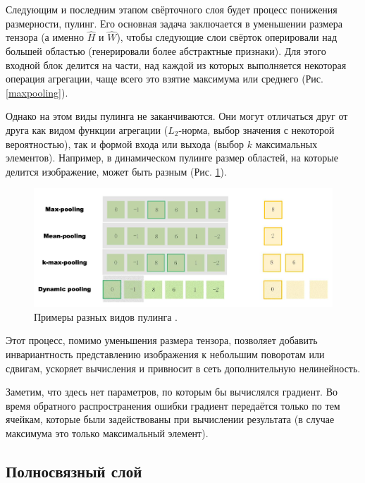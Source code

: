 \documentclass[12pt, fleqn]{article}
\begin{document}
    Следующим и последним этапом свёрточного слоя будет процесс понижения размерности, 
    пулинг. Его основная задача заключается в уменьшении размера тензора (а именно $\hat{H}$ и $\hat{W}$), 
    чтобы следующие слои свёрток оперировали над большей областью (генерировали более абстрактные признаки). 
    Для этого входной блок делится на части, над каждой из которых выполняется некоторая операция агрегации, 
    чаще всего это взятие максимума или среднего (Рис. \ref{maxpooling}).

    Однако на этом виды пулинга не заканчиваются. Они могут отличаться друг от друга как видом
    функции агрегации ($L_2$-норма, выбор значения с некоторой вероятностью), так и формой входа или 
    выхода (выбор $k$ максимальных элементов). Например, в динамическом пулинге размер областей, 
    на которые делится изображение, может быть разным (Рис. \ref{pooling_types}).

    \begin{figure}[ht]
        \centering
        \includegraphics[scale=0.35]{pics/pooling_types.png}
        \caption{Примеры разных видов пулинга \cite{pooling_pic}.}
        \label{pooling_types}
    \end{figure}

    Этот процесс, помимо уменьшения размера тензора, позволяет добавить инвариантность
    представлению изображения к небольшим поворотам или сдвигам, ускоряет вычисления и 
    привносит в сеть дополнительную нелинейность. 
    
    Заметим,
    что здесь нет параметров, по которым бы вычислялся градиент. Во время обратного распространения 
    ошибки градиент передаётся только по тем ячейкам, которые были задействованы при вычислении 
    результата (в случае максимума это только максимальный элемент).

    \subsection{Полносвязный слой}
\end{document}
